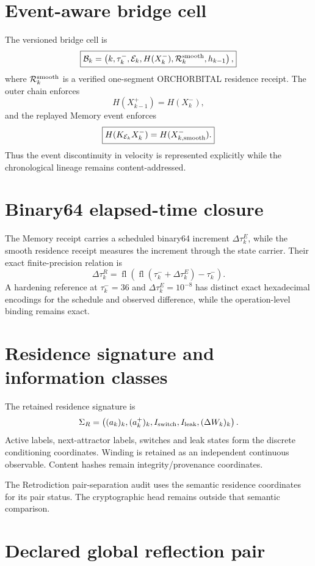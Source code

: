 \section{Event-aware bridge cell}

The versioned bridge cell is
\[
\boxed{
\mathcal B_k=
\left(
 k,
 \tau_k^-,
 \mathcal E_k,
 H(X_k^-),
 \mathcal R_k^{\rm smooth},
 h_{k-1}
\right),
}
\]
where \(\mathcal R_k^{\rm smooth}\) is a verified one-segment ORCHORBITAL residence receipt. The outer chain enforces
\[
\boxed{H(X_{k-1}^+)=H(X_k^-)},
\]
and the replayed Memory event enforces
\[
\boxed{
H(K_{\mathcal E_k}X_k^-)
=H(X_{k,\rm smooth}^-).
}
\]
Thus the event discontinuity in velocity is represented explicitly while the chronological lineage remains content-addressed.

\section{Binary64 elapsed-time closure}

The Memory receipt carries a scheduled binary64 increment \(\Delta\tau_k^E\), while the smooth residence receipt measures the increment through the state carrier. Their exact finite-precision relation is
\[
\boxed{
\Delta\tau_k^R
=
\operatorname{fl}
\left(
\operatorname{fl}(\tau_k^-+\Delta\tau_k^E)-\tau_k^-
\right).
}
\]
A hardening reference at \(\tau_k^-=36\) and \(\Delta\tau_k^E=10^{-8}\) has distinct exact hexadecimal encodings for the schedule and observed difference, while the operation-level binding remains exact.

\section{Residence signature and information classes}

The retained residence signature is
\[
\Sigma_R=
\left(
(a_k)_k,
(a_k^+)_k,
I_{\rm switch},
I_{\rm leak},
(\Delta W_k)_k
\right).
\]
Active labels, next-attractor labels, switches and leak states form the discrete conditioning coordinates. Winding is retained as an independent continuous observable. Content hashes remain integrity/provenance coordinates.

The Retrodiction pair-separation audit uses the semantic residence coordinates for its pair status. The cryptographic head remains outside that semantic comparison.

\section{Declared global reflection pair}


